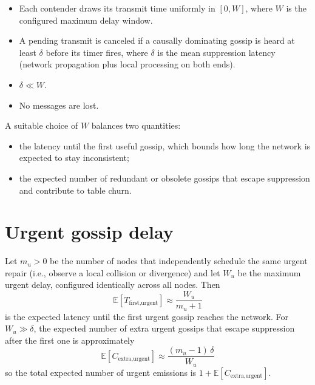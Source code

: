\begin{itemize}
    \item Each contender draws its transmit time uniformly in $[0, W]$,
    where $W$ is the configured maximum delay window.
    \item A pending transmit is canceled if a causally dominating gossip is
    heard at least $\delta$ before its timer fires, where $\delta$ is the
    mean suppression latency (network propagation plus local processing on
    both ends).
    \item $\delta \ll W$.
    \item No messages are lost.
\end{itemize}

A suitable choice of $W$ balances two quantities:

\begin{itemize}
    \item the latency until the first useful gossip, which bounds how long
    the network is expected to stay inconsistent;
    \item the expected number of redundant or obsolete gossips that escape
    suppression and contribute to table churn.
\end{itemize}

\section{Urgent gossip delay}\label{sec:appendix_gossip_delays_urgent}

Let $m_u > 0$ be the number of nodes that independently schedule the same
urgent repair (i.e., observe a local collision or divergence) and let $W_u$
be the maximum urgent delay, configured identically across all nodes. Then
\begin{equation*}
    \mathbb{E}\!\left[T_{\text{first,urgent}}\right] \approx \frac{W_u}{m_u + 1}
\end{equation*}
is the expected latency until the first urgent gossip reaches the network.
For $W_u \gg \delta$, the expected number of extra urgent gossips that
escape suppression after the first one is approximately
\begin{equation*}
    \mathbb{E}\!\left[C_{\text{extra,urgent}}\right] \approx
        \frac{(m_u - 1)\,\delta}{W_u}
\end{equation*}
so the total expected number of urgent emissions is
$1 + \mathbb{E}[C_{\text{extra,urgent}}]$.

